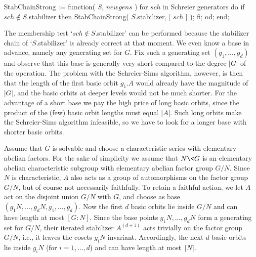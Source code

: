 StabChainStrong := function( $S$, $newgens$ )
\quad for $sch$  in {\rm Schreier generators}  do
\qquad if $sch \notin S$.stabilizer  then
\qquad\quad StabChainStrong( $S$.stabilizer, [ $sch$ ] );
\qquad fi;
\quad od;
end;

The membership test `$sch  \notin S$.stabilizer' can be performed because
the  stabilizer chain  of `$S$.stabilizer'  is   already correct at  that
moment. We  even know a base  in advance, namely  any  generating set for
$G$. Fix such  a generating set  $(g_1,\ldots,g_d)$ and observe that this
base  is  generally very   short compared  to   the degree $|G|$  of  the
operation. The problem with the Schreier-Sims algorithm, however, is then
that the length of the first  basic orbit $g_1.A$  would already have the
magnitude of $|G|$,  and the basic orbits at  deeper levels would  not be
much shorter. For the advantage of a short base  we pay the high price of
long basic  orbits, since the  product of  the  (few) basic orbit lengths
must  equal $|A|$.  Such  long  orbits  make the Schreier-Sims  algorithm
infeasible,   so we have to   look for a  longer base  with shorter basic
orbits.

Assume that   $G$ is solvable  and  choose  a  characteristic series with
elementary abelian factors. For the sake of  simplicity we assume that $N
\< G$ is an   elementary abelian characteristic subgroup  with elementary
abelian factor group $G/N$. Since $N$ is characteristic, $A$ also acts as
a group of automorphisms  on the factor  group $G/N$,  but of course  not
necessarily  faithfully. To retain  a faithful action,  we let $A$ act on
the   disjoint   union   $G/N$   with   $G$,   and   choose    as    base
$(g_1N,\ldots,g_dN,g_1,\ldots,g_d)$. Now the first $d$ basic  orbits  lie
inside $G/N$ and can have length at most $[G\mathbin:N]$. Since the  base
points $g_1N,\ldots,  g_dN$  form  a  generating  set  for  $G/N$,  their
iterated stabilizer $A^{(d+1)}$ acts trivially on the factor group $G/N$,
i.e., it leaves the cosets $g_iN$ invariant. Accordingly,  the  next  $d$
basic orbits lie inside $g_iN$ (for $i=1,\ldots,d$) and can  have  length
at most~$|N|$.

